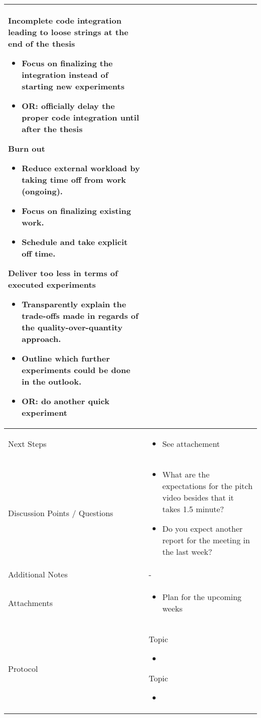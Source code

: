 \documentclass[a4paper,11pt]{article}
\begin{document}
\begin{longtable}{|p{3.5cm}|>{\vspace{-\baselineskip}}p{12cm}|}
		Incomplete code integration leading to loose strings at the end of the thesis
		\begin{itemize}
			\item Focus on finalizing the integration instead of starting new experiments
			\item OR: officially delay the proper code integration until after the thesis
		\end{itemize}
		
		Burn out
		\begin{itemize}
			\item Reduce external workload by taking time off from work (ongoing).
			\item Focus on finalizing existing work.
			\item Schedule and take explicit off time.
		\end{itemize}
		
	    Deliver too less in terms of executed experiments
		\begin{itemize}
			\item Transparently explain the trade-offs made in regards of the quality-over-quantity approach.
			\item Outline which further experiments could be done in the outlook.
			\item OR: do another quick experiment
		\end{itemize} \\
		
		\hline
		Next Steps & \begin{itemize}[topsep=6pt]
			\item See attachement
		\end{itemize} \\
		\hline
		Discussion Points / Questions & \begin{itemize}[topsep=6pt]
			\item What are the expectations for the pitch video besides that it takes 1.5 minute?
			\item Do you expect another report for the meeting in the last week?
		\end{itemize} \\
		\hline
		Additional Notes & - \\
		\hline
		Attachments  & \begin{itemize}[topsep=6pt]
			\item Plan for the upcoming weeks
		\end{itemize} \\
		\hline
		Protocol  & 
		Topic
		\begin{itemize}
			\item 
		\end{itemize}
		
		Topic
		\begin{itemize}
			\item 
		\end{itemize}
		\\
		\hline
	\end{longtable}
	
\end{document}
